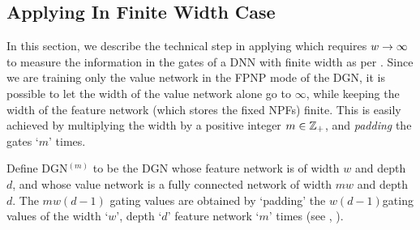\begin{appendix}
\section{Applying  In Finite Width Case}
In this section, we describe the technical step in applying  which requires $w\rightarrow\infty$ to measure the information in the gates of a DNN  with finite width as per . Since we are training only the value network in the FPNP mode of the DGN, it is possible to let the width of the value network alone go to $\infty$, while keeping the width of the feature network (which stores the fixed NPFs) finite. This is easily achieved by multiplying the width by a positive integer $m\in\mathbb{Z}_{+}$, and \emph{padding} the gates `$m$' times.
\begin{definition}
Define DGN${}^{(m)}$ to be the DGN whose feature network is of width $w$ and depth $d$, and whose value network  is a fully connected network of width $mw$ and depth $d$. The $mw(d-1)$ gating values are obtained by `padding' the $w(d-1)$gating values of the width `$w$', depth `$d$' feature network `$m$' times (see , ). 
\end{definition}


\end{appendix}
